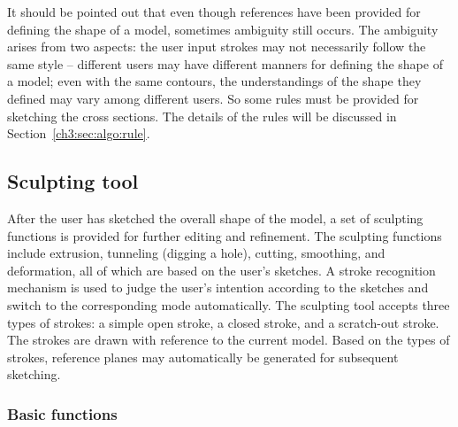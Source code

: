 It should be pointed out that even though references have been
provided for defining the shape of a model, sometimes ambiguity
still occurs. The ambiguity arises from two aspects: the user input
strokes may not necessarily follow the same style -- different users
may have different manners for defining the shape of a model; even
with the same contours, the understandings of the shape they defined
may vary among different users. So some rules must be provided for
sketching the cross sections. The details of the rules will be
discussed in Section~\ref{ch3:sec:algo:rule}.

\subsection{Sculpting tool}
\label{ch3:sec:ui:sculpt}

After the user has sketched the overall shape of the model, a set of
sculpting functions is provided for further editing and refinement.
The sculpting functions include extrusion, tunneling (digging a
hole), cutting, smoothing, and deformation, all of which are based
on the user's sketches. A stroke recognition mechanism is used to
judge the user's intention according to the sketches and switch to
the corresponding mode automatically. The sculpting tool accepts
three types of strokes: a simple open stroke, a closed stroke, and a
scratch-out stroke. The strokes are drawn with reference to the
current model. Based on the types of strokes, reference planes may
automatically be generated for subsequent sketching.


\subsubsection{Basic functions}
\label{Sec:UI:sculpt:mode}

